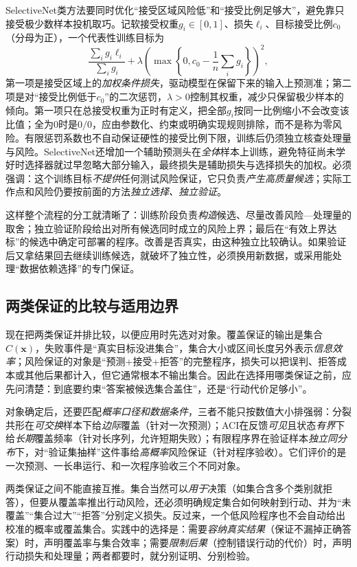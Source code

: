 SelectiveNet类方法要同时优化“接受区域风险低”和“接受比例足够大”，避免靠只接受极少数样本投机取巧。记软接受权重$g_i\in[0,1]$、损失$\ell_i$、目标接受比例$c_0$（分母为正），一个代表性训练目标为
\begin{equation}
 \frac{\sum_i g_i\ell_i}{\sum_i g_i}
 +\lambda\left(\max\left\{0,c_0-\frac1n\sum_i g_i\right\}\right)^2,
 \label{eq:reliability-selective-training}
\end{equation}
第一项是接受区域上的\emph{加权条件损失}，驱动模型在保留下来的输入上预测准；第二项是对“接受比例低于$c_0$”的二次惩罚，$\lambda>0$控制其权重，减少只保留极少样本的倾向。第一项只在总接受权重为正时有定义，把全部$g_i$按同一比例缩小不会改变该比值；全为0时是$0/0$，应由参数化、约束或明确实现规则排除，而不是称为零风险。有限惩罚系数也不自动保证硬性的接受比例下限，训练后仍须独立核查处理量与风险。SelectiveNet还增加一个辅助预测头在\emph{全体}样本上训练，避免特征尚未学好时选择器就过早忽略大部分输入，最终损失是辅助损失与选择损失的加权。必须强调：这个训练目标\emph{不提供}任何测试风险保证，它只负责\emph{产生高质量候选}；实际工作点和风险仍要按前面的方法\emph{独立选择、独立验证}。

这样整个流程的分工就清晰了：训练阶段负责\emph{构造}候选、尽量改善风险—处理量的取舍；独立验证阶段给出对所有候选同时成立的风险上界；最后在“有效上界达标”的候选中确定可部署的程序。改善是否真实，由这种独立比较确认。如果验证后又拿结果回去继续训练候选，就破坏了独立性，必须换用新数据，或采用能处理“数据依赖选择”的专门保证。

\subsection{两类保证的比较与适用边界}

现在把两类保证并排比较，以便应用时先选对对象。覆盖保证的输出是集合$C(\bm{x})$，失败事件是“真实目标没进集合”，集合大小或区间长度另外表示\emph{信息效率}；风险保证的对象是“预测+接受+拒答”的完整程序，损失可以把误判、拒答成本或其他后果都计入，但它通常根本不输出集合。因此在选择用哪类保证之前，应先问清楚：到底要约束“答案被候选集合盖住”，还是“行动代价足够小”。

对象确定后，还要匹配\emph{概率口径和数据条件}，三者不能只按数值大小排强弱：分裂共形在\emph{可交换}样本下给\emph{边际}覆盖（针对一次预测）；ACI在反馈\emph{可见}且状态\emph{有界}下给\emph{长期}覆盖频率（针对长序列，允许短期失败）；有限程序界在验证样本\emph{独立同分布}下，对“验证集抽样”这件事给\emph{高概率}风险保证（针对程序验收）。它们评价的是一次预测、一长串运行、和一次程序验收三个不同对象。

两类保证之间不能直接互推。集合当然可以\emph{用于}决策（如集合含多个类别就拒答），但要从覆盖率推出行动风险，还必须明确规定集合如何映射到行动、并为“未覆盖”“集合过大”“拒答”分别定义损失。反过来，一个低风险程序也不会自动给出校准的概率或覆盖集合。实践中的选择是：需要\emph{容纳真实结果}（保证不漏掉正确答案）时，声明覆盖率与集合效率；需要\emph{限制后果}（控制错误行动的代价）时，声明行动损失和处理量；两者都要时，就分别证明、分别检验。

